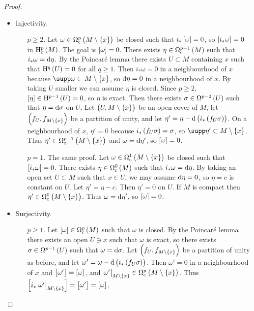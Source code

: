 \begin{proof}
\hfill
\begin{itemize}
\item Injectivity.
\begin{itemize}
\item[$ p \ge 2 $.] Let $ \omega \in \Omega_\c^p\br{M \setminus \cbr{x}} $ be closed such that $ i_*\sbr{\omega} = 0 $, so $ \sbr{i_*\omega} = 0 $ in $ \H_\c^p\br{M} $. The goal is $ \sbr{\omega} = 0 $. There exists $ \eta \in \Omega_\c^{p - 1}\br{M} $ such that $ i_*\omega = \mathrm{d}\eta $. By the Poincar\'e lemma there exists $ U \subset M $ containing $ x $ such that $ \H^q\br{U} = 0 $ for all $ q \ge 1 $. Then $ i_*\omega = 0 $ in a neighbourhood of $ x $ because $ \supp \omega \subset M \setminus \cbr{x} $, so $ \mathrm{d}\eta = 0 $ in a neighbourhood of $ x $. By taking $ U $ smaller we can assume $ \eta $ is closed. Since $ p \ge 2 $, $ \sbr{\eta} \in \H^{p - 1}\br{U} = 0 $, so $ \eta $ is exact. Then there exists $ \sigma \in \Omega^{p - 2}\br{U} $ such that $ \eta = \mathrm{d}\sigma $ on $ U $. Let $ \br{U, M \setminus \cbr{x}} $ be an open cover of $ M $, let $ \br{f_U, f_{M \setminus \cbr{x}}} $ be a partition of unity, and let $ \eta' = \eta - \d\br{i_*\br{f_U\sigma}} $. On a neighbourhood of $ x $, $ \eta' = 0 $ because $ i_*\br{f_U\sigma} = \sigma $, so $ \supp \eta' \subset M \setminus \cbr{x} $. Thus $ \eta' \in \Omega_\c^{p - 1}\br{M \setminus \cbr{x}} $ and $ \omega = \mathrm{d}\eta' $, so $ \sbr{\omega} = 0 $.
\item[$ p = 1 $.] The same proof. Let $ \omega \in \Omega_\c^1\br{M \setminus \cbr{x}} $ be closed such that $ \sbr{i_*\omega} = 0 $. There exists $ \eta \in \Omega_\c^0\br{M} $ such that $ i_*\omega = \mathrm{d}\eta $. By taking an open set $ U \subset M $ such that $ x \in U $, we may assume $ \mathrm{d}\eta = 0 $, so $ \eta = c $ is constant on $ U $. Let $ \eta' = \eta - c $. Then $ \eta' = 0 $ on $ U $. If $ M $ is compact then $ \eta' \in \Omega_\c^0\br{M \setminus \cbr{x}} $. Thus $ \omega = \mathrm{d}\eta' $, so $ \sbr{\omega} = 0 $.
\end{itemize}
\item Surjectivity.
\begin{itemize}
\item[$ p \ge 1 $.] Let $ \sbr{\omega} \in \Omega_\c^p\br{M} $ such that $ \omega $ is closed. By the Poincar\'e lemma there exists an open $ U \ni x $ such that $ \omega $ is exact, so there exists $ \sigma \in \Omega^{p - 1}\br{U} $ such that $ \omega = \mathrm{d}\sigma $. Let $ \br{f_U, f_{M \setminus \cbr{x}}} $ be a partition of unity as before, and let $ \omega' = \omega - \d\br{i_*\br{f_U\sigma}} $. Then $ \omega' = 0 $ in a neighbourhood of $ x $ and $ \sbr{\omega'} = \sbr{\omega} $, and $ \eval{\omega'}_{M \setminus \cbr{x}} \in \Omega_\c^p\br{M \setminus \cbr{x}} $. Thus $ \sbr{i_*\eval{\omega'}_{M \setminus \cbr{x}}} = \sbr{\omega'} = \sbr{\omega} $.
\end{itemize}
\end{itemize}
\end{proof}

